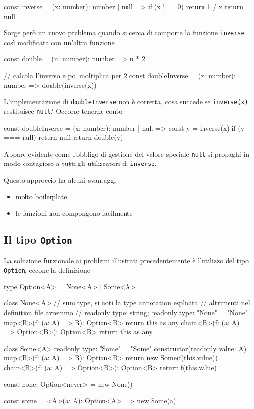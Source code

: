 \documentclass[12pt]{article}
\theoremstyle{definition}
\newenvironment{code}
  {\vspace{0.5cm} \VerbatimEnvironment\begin{typescriptcode}}
  {\end{typescriptcode} \vspace{0.2cm}}
\begin{document}
\begin{code}
const inverse = (x: number): number | null => {
  if (x !== 0) return 1 / x
  return null
}
\end{code}

Sorge però un nuovo problema quando si cerca di comporre la funzione \texttt{inverse} così modificata con un'altra funzione

\begin{code}
const double = (n: number): number => n * 2

// calcola l'inverso e poi moltiplica per 2
const doubleInverse = (x: number): number => double(inverse(x))
\end{code}

L'implementazione di \texttt{doubleInverse} non è corretta, cosa succede se \texttt{inverse(x)} restituisce \texttt{null}?
Occorre tenerne conto

\begin{code}
const doubleInverse = (x: number): number | null => {
  const y = inverse(x)
  if (y === null) return null
  return double(y)
}
\end{code}

Appare evidente come l'obbligo di gestione del valore speciale \texttt{null} si propaghi in modo contagioso
a tutti gli utilizzatori di \texttt{inverse}.

Questo approccio ha alcuni svantaggi

\begin{itemize}
  \item molto boilerplate
  \item le funzioni non compongono facilmente
\end{itemize}

\subsection{Il tipo \texttt{Option}}

La soluzione funzionale ai problemi illustrati precedentemente è l'utilizzo del tipo \texttt{Option},
eccone la definizione

\begin{code}
type Option<A> = None<A> | Some<A>

class None<A> {
  // sum type, si noti la type annotation esplicita
  // altrimenti nel definition file avremmo
  // readonly type: string;
  readonly type: "None" = "None"
  map<B>(f: (a: A) => B): Option<B> {
    return this as any
  }
  chain<B>(f: (a: A) => Option<B>): Option<B> {
    return this as any
  }
}

class Some<A> {
  readonly type: "Some" = "Some"
  constructor(readonly value: A) {}
  map<B>(f: (a: A) => B): Option<B> {
    return new Some(f(this.value))
  }
  chain<B>(f: (a: A) => Option<B>): Option<B> {
    return f(this.value)
  }
}

const none: Option<never> = new None()

const some = <A>(a: A): Option<A> => new Some(a)
\end{code}
\end{document}
